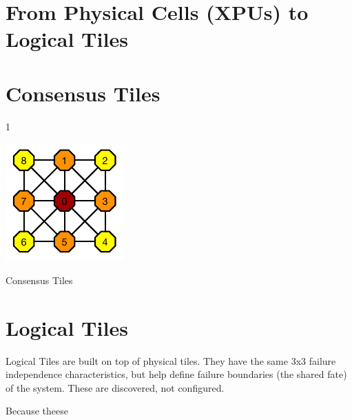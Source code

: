 \section{From Physical Cells (XPUs) to Logical Tiles}

\section{Consensus Tiles} 1

 \begin{marginfigure}
  \includegraphics[width=1.0\linewidth]{../../FIGURES/ConsensusTile.pdf}
   \caption{Consensus Tiles}
      \vspace{2em}
\end{marginfigure}

\clearpage
\section{Logical Tiles}

Logical Tiles are built on top of physical tiles.  They have the same 3x3 failure independence characteristics, but help define failure boundaries (the shared fate) of the system. These are discovered, not configured.  

Because theese 


